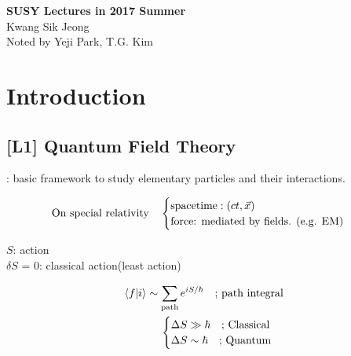 \documentclass[11pt,letterpaper]{article}
\begin{document}


\begin{center}
{\Huge \bfseries SUSY Lectures in 2017 Summer}\\[10mm]
Kwang Sik Jeong \footnotemark[1] \\
\VS
{\SM Noted by Yeji Park, T.G. Kim} 
\end{center}


    

\tableofcontents

\newpage

\section{Introduction}

\subsection{[L1] Quantum Field Theory}

    : basic framework to study elementary particles and their interactions.

\begin{center}
{\color{blue}{"special relativity + Quantum mechanics"}}
\end{center}

%
\begin{equation*}
 \textnormal{On special relativity} \quad
 \begin{cases}
  \textnormal{spacetime}: (ct,\vec{x}) \\
  \textnormal{force: mediated by fields. (e.g. EM)}
 \end{cases}
\end{equation*}


$S$: action \\
$\delta S$ = 0: classical action(least action)

\begin{align*}
 \braket{f|i} \sim \sum_{\text{path}}e^{iS/\hbar} \quad \textnormal{; path integral} \\
 \begin{cases}
  \Delta S \gg \hbar \quad \textnormal{; Classical} \\
  \Delta S \sim \hbar \quad \textnormal{; Quantum}
 \end{cases}
\end{align*}

%
\end{document}
